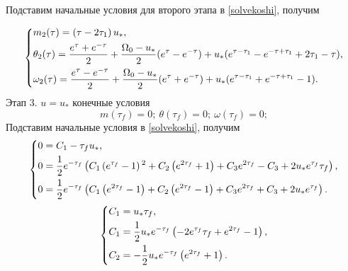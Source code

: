 \documentclass[a4paper,14pt]{article}
\theoremstyle{plain} %
\theoremstyle{definition} %
\theoremstyle{remark} %
\begin{document}
{Подставим начальные условия для второго этапа в \eqref{solvekoshi}, получим

\[
    \left\{ {\begin{aligned}
                 & m_2(\tau) = \left(\tau -2 \tau _1\right) u_*, \hfill                                                                                                \\
                 & \theta_2(\tau) = \frac{e^\tau+e^{-\tau}}{2}+\frac{\Omega_0-u_\ast}{2}(e^\tau-e^{-\tau})+u_*(e^{\tau-\tau_1}-e^{-\tau+\tau_1}+2\tau_1-\tau) , \hfill \\
                 & \omega_2(\tau) = \frac{e^\tau-e^{-\tau}}{2}+\frac{\Omega_0-u_\ast}{2}(e^\tau+e^{-\tau})+u_*(e^{\tau-\tau_1}+e^{-\tau+\tau_1}-1) . \hfill            \\
            \end{aligned}} \right.
\]
Этап 3. $u=u_*$ конечные условия
\[
    m(\tau_f)=0; \ \theta(\tau_f)=0;\ \omega(\tau_f)=0;
\]
Подставим начальные условия в \eqref{solvekoshi}, получим
\[
    \left\{ {\begin{aligned}
                 & 0 = C_1-\tau_f  u_*, \hfill                                               \\
                 & 0 = \frac{1}{2} e^{-\tau _f} \left(C_1 \left(e^{\tau _f}-1\right){}^2+C_2
                \left(e^{2 \tau _f}+1\right)+C_3 e^{2 \tau _f}-C_3+2 u_* e^{\tau _f} \tau
                _f\right), \hfill                                                            \\
                 & 0 = \frac{1}{2} e^{-\tau _f} \left(C_1 \left(e^{2 \tau _f}-1\right)+C_2
                \left(e^{2 \tau _f}-1\right)+C_3 e^{2 \tau _f}+C_3+2 u_* e^{\tau
                _f}\right)  . \hfill                                                         \\
            \end{aligned}} \right.
\]
\[
    \left\{ {\begin{aligned}
                 & C_1 = u_* \tau _f, \hfill                                                  \\
                 & C_1 = \frac{1}{2} u_* e^{-\tau _f} \left(-2 e^{\tau _f} \tau _f+e^{2 \tau
                _f}-1\right), \hfill                                                          \\
                 & C_2 = -\frac{1}{2} u_* e^{-\tau _f} \left(e^{2 \tau _f}+1\right)  . \hfill \\
            \end{aligned}} \right.
\]}
\end{document}
